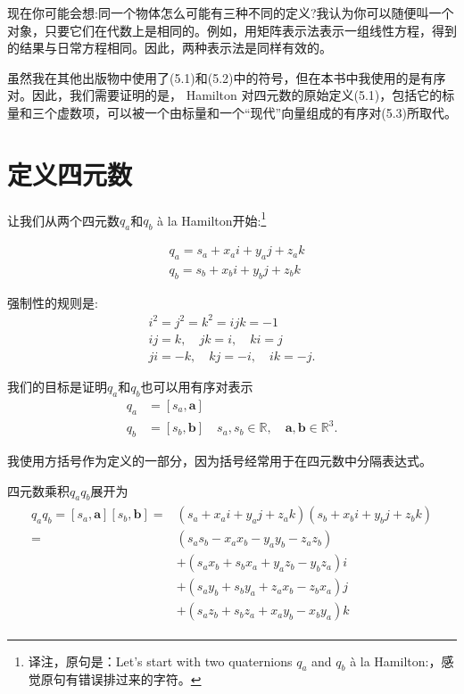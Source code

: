 现在你可能会想:同一个物体怎么可能有三种不同的定义?我认为你可以随便叫一个对象，只要它们在代数上是相同的。例如，用矩阵表示法表示一组线性方程，得到的结果与日常方程相同。因此，两种表示法是同样有效的。

虽然我在其他出版物中使用了(5.1)和(5.2)中的符号，但在本书中我使用的是有序对。因此，我们需要证明的是， Hamilton 对四元数的原始定义(5.1)，包括它的标量和三个虚数项，可以被一个由标量和一个“现代”向量组成的有序对(5.3)所取代。

\section{定义四元数}
让我们从两个四元数$q_{a}$和$q_{b}$ à la Hamilton开始:\footnote{译注，原句是：Let's start with two quaternions $q_{a}$ and $q_{b}$ à la Hamilton:，感觉原句有错误排过来的字符。 }


$$
\begin{aligned}
& q_{a}=s_{a}+x_{a} i+y_{a} j+z_{a} k \\
& q_{b}=s_{b}+x_{b} i+y_{b} j+z_{b} k
\end{aligned}
$$

强制性的规则是:
$$
\begin{gathered}
i^{2}=j^{2}=k^{2}=i j k=-1 \\
i j=k, \quad j k=i, \quad k i=j \\
j i=-k, \quad k j=-i, \quad i k=-j .
\end{gathered}
$$

我们的目标是证明$q_{a}$和$q_{b}$也可以用有序对表示
$$
\begin{aligned}
q_{a} & =\left[s_{a}, \mathbf{a}\right] \\
q_{b} & =\left[s_{b}, \mathbf{b}\right] \quad s_{a}, s_{b} \in \mathbb{R}, \quad \mathbf{a}, \mathbf{b} \in \mathbb{R}^{3} .
\end{aligned}
$$

我使用方括号作为定义的一部分，因为括号经常用于在四元数中分隔表达式。

四元数乘积$q_{a} q_{b}$展开为
\begin{align}
    \begin{aligned}
        q_{a} q_{b}=\left[s_{a}, \mathbf{a}\right]\left[s_{b}, \mathbf{b}\right]= & \left(s_{a}+x_{a} i+y_{a} j+z_{a} k\right)\left(s_{b}+x_{b} i+y_{b} j+z_{b} k\right) \\
        = & \left(s_{a} s_{b}-x_{a} x_{b}-y_{a} y_{b}-z_{a} z_{b}\right) \\
        & +\left(s_{a} x_{b}+s_{b} x_{a}+y_{a} z_{b}-y_{b} z_{a}\right) i \\
        & +\left(s_{a} y_{b}+s_{b} y_{a}+z_{a} x_{b}-z_{b} x_{a}\right) j \\
        & +\left(s_{a} z_{b}+s_{b} z_{a}+x_{a} y_{b}-x_{b} y_{a}\right) k
        \end{aligned}
\end{align}

